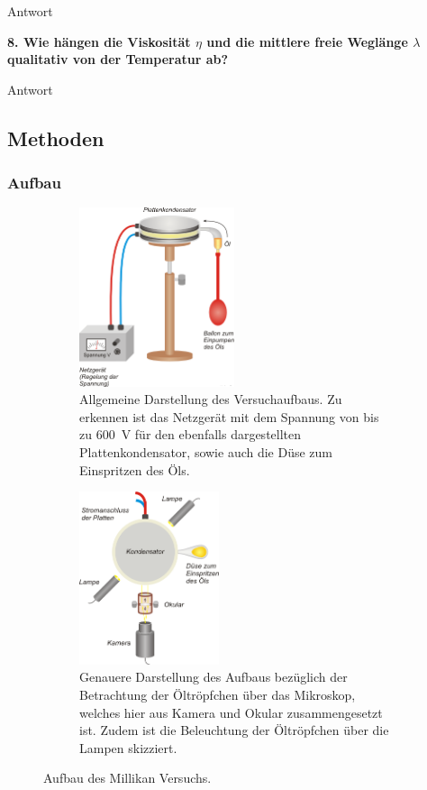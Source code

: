 	Antwort

\noindent \textbf{8. Wie hängen die Viskosität $\eta$ und die mittlere freie Weglänge $\lambda$ qualitativ von der Temperatur ab?}

	Antwort
	

\subsection{Methoden}

\subsubsection{Aufbau}

\begin{figure}[ht]
	\centering
	\begin{subfigure}{\textwidth}
		\centering
		\includegraphics[width=0.5\textwidth]{auswertung/aufbau_1.png}
		\caption{Allgemeine Darstellung des Versuchaufbaus. Zu erkennen ist das Netzgerät mit dem Spannung von bis zu \SI{600}{\volt} für den ebenfalls dargestellten Plattenkondensator, sowie auch die Düse zum Einspritzen des Öls.\cite{Aufbau}}
		\label{fig:aufbau1}	
	\end{subfigure}
	\begin{subfigure}{\textwidth}
		\centering
		\includegraphics[width=0.45\textwidth]{auswertung/aufbau_2.png}
		\caption{Genauere Darstellung des Aufbaus bezüglich der Betrachtung der Öltröpfchen über das Mikroskop, welches hier aus Kamera und Okular zusammengesetzt ist. Zudem ist die Beleuchtung der Öltröpfchen über die Lampen skizziert.\cite{Aufbau}}
		\label{fig:aufbau2}	
	\end{subfigure}
	\caption{Aufbau des Millikan Versuchs.}
	\label{fig:aufbau}	
\end{figure}

